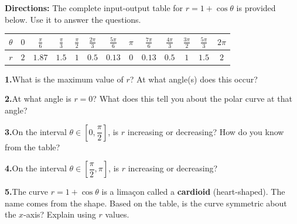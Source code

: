 \documentclass[10pt]{article}
\begin{document}
\begin{tcolorbox}[colback=white, colframe=black!40,
    title=\textbf{Tier R --- Reinforce},
    fonttitle=\bfseries, arc=2mm, left=3mm, right=3mm, top=2mm, bottom=2mm]

\textbf{Directions:} The complete input-output table for $r = 1 + \cos\theta$ is
provided below. Use it to answer the questions.

\vspace{4pt}
\renewcommand{\arraystretch}{1.55}
\begin{tabular}{|c|c|c|c|c|c|c|c|c|c|c|c|c|}
\hline
$\theta$ & $0$ & $\frac{\pi}{6}$ & $\frac{\pi}{3}$ & $\frac{\pi}{2}$ &
           $\frac{2\pi}{3}$ & $\frac{5\pi}{6}$ & $\pi$ &
           $\frac{7\pi}{6}$ & $\frac{4\pi}{3}$ & $\frac{3\pi}{2}$ &
           $\frac{5\pi}{3}$ & $2\pi$ \\
\hline
$r$ & $2$ & $1.87$ & $1.5$ & $1$ & $0.5$ & $0.13$ & $0$ &
      $0.13$ & $0.5$ & $1$ & $1.5$ & $2$ \\
\hline
\end{tabular}

\vspace{8pt}
\textbf{1.}\quad What is the maximum value of $r$? \underline{\hspace{1.5cm}} \quad
At what angle(s) does this occur? \underline{\hspace{2.5cm}}

\vspace{6pt}
\textbf{2.}\quad At what angle is $r = 0$? \underline{\hspace{2cm}} \quad
What does this tell you about the polar curve at that angle? \writeline

\vspace{6pt}
\textbf{3.}\quad On the interval $\theta \in \left[0, \dfrac{\pi}{2}\right]$,
is $r$ increasing or decreasing? \underline{\hspace{2.5cm}}
How do you know from the table? \writeline

\vspace{6pt}
\textbf{4.}\quad On the interval $\theta \in \left[\dfrac{\pi}{2}, \pi\right]$,
is $r$ increasing or decreasing? \underline{\hspace{2.5cm}}

\vspace{6pt}
\textbf{5.}\quad The curve $r = 1 + \cos\theta$ is a limaçon called a
\textbf{cardioid} (heart-shaped). The name comes from the shape. Based on the
table, is the curve symmetric about the $x$-axis? Explain using $r$ values.


\end{tcolorbox}
\end{document}
